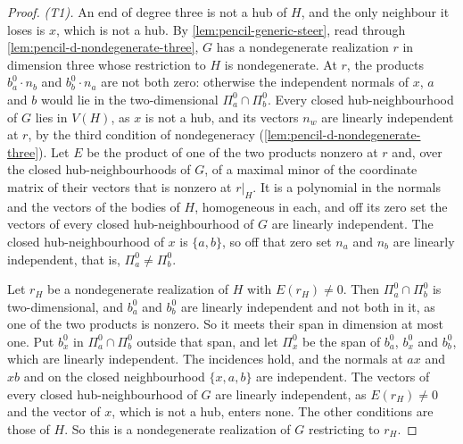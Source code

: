 \begin{proof}
  \leanok
  \emph{(T1).} An end of degree three is not a hub of $H$, and the only
  neighbour it loses is $x$, which is not a hub. By
  \cref{lem:pencil-generic-steer}, read through
  \cref{lem:pencil-d-nondegenerate-three}, $G$ has a nondegenerate
  realization $r$ in dimension three whose restriction to $H$ is
  nondegenerate. At $r$, the products $b^0_a \cdot n_b$ and
  $b^0_b \cdot n_a$ are not both zero: otherwise the independent normals
  of $x$, $a$ and $b$ would lie in the two-dimensional
  $\Pi^0_a \cap \Pi^0_b$. Every closed hub-neighbourhood of $G$ lies in
  $V(H)$, as $x$ is not a hub, and its vectors $n_w$ are linearly
  independent at $r$, by the third condition of nondegeneracy
  (\cref{lem:pencil-d-nondegenerate-three}). Let $E$ be the product of one
  of the two products nonzero at $r$ and, over the closed
  hub-neighbourhoods of $G$, of a maximal minor of the coordinate matrix
  of their vectors that is nonzero at $r|_H$. It is a polynomial in the
  normals and the vectors of the bodies of $H$, homogeneous in each, and
  off its zero set the vectors of every closed hub-neighbourhood of $G$
  are linearly independent. The closed hub-neighbourhood of $x$ is
  $\{a, b\}$, so off that zero set $n_a$ and $n_b$ are linearly
  independent, that is, $\Pi^0_a \ne \Pi^0_b$.

  Let $r_H$ be a nondegenerate realization of $H$ with $E(r_H) \ne 0$.
  Then $\Pi^0_a \cap \Pi^0_b$ is two-dimensional, and $b^0_a$ and $b^0_b$
  are linearly independent and not both in it, as one of the two products
  is nonzero. So it meets their span in dimension at most one. Put
  $b^0_x$ in $\Pi^0_a \cap \Pi^0_b$ outside that span, and let $\Pi^0_x$
  be the span of $b^0_a$, $b^0_x$ and $b^0_b$, which are linearly
  independent. The incidences hold, and the normals at $ax$ and $xb$ and
  on the closed neighbourhood $\{x, a, b\}$ are independent. The vectors
  of every closed hub-neighbourhood of $G$ are linearly independent, as
  $E(r_H) \ne 0$ and the vector of $x$, which is not a hub, enters none.
  The other conditions are those of $H$. So this is a nondegenerate
  realization of $G$ restricting to $r_H$.


\end{proof}
